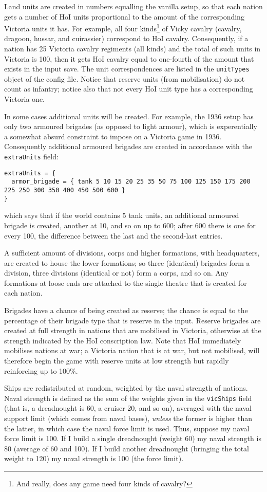 \documentclass[12pt,ebook,oneside]{book}
\begin{document}
Land units are created in numbers equalling the vanilla setup, so that
each nation gets a number of HoI units proportional to the amount of the
corresponding Victoria units it has. For example, all four
kinds\footnote{And really, does any game need four kinds of cavalry?}
of Vicky cavalry (cavalry, dragoon, hussar, and cuirassier) correspond
to HoI cavalry. Consequently, if a nation has 25 Victoria cavalry
regiments (all kinds) and the total of such units in Victoria is 100,
then it gets HoI cavalry equal to one-fourth of the amount that exists
in the input save. The unit correspondences are listed in the
\texttt{unitTypes} object of the config file. Notice that reserve
units (from mobilisation) do not count as infantry; notice also that
not every HoI unit type has a corresponding Victoria one. 

In some cases additional units will be created. For example, the 1936
setup has only two armoured brigades (as opposed to light armour),
which is experentially a somewhat absurd constraint to impose on a
Victoria game in 1936. Consequently additional armoured brigades are
created in accordance with the \texttt{extraUnits} field:
\begin{verbatim}
extraUnits = {
  armor_brigade = { tank 5 10 15 20 25 35 50 75 100 125 150 175 200 225 250 300 350 400 450 500 600 }
}
\end{verbatim}
which says that if the world contains 5 tank units, an additional
armoured brigade is created, another at 10, and so on up to 600; after
600 there is one for every 100, the difference between the last and
the second-last entries. 

A sufficient amount of divisions, corps and higher formations, with headquarters, are created to
house the lower formations; so three (identical) brigades form a
division, three divisions (identical or not) form a corps, and so
on. Any formations at loose ends are attached to the single theatre
that is created for each nation. 

Brigades have a chance of being created as reserve; the chance is
equal to the percentage of their brigade type that is reserve in the
input. Reserve brigades are created at full strength in nations that
are mobilised in Victoria, otherwise at the strength indicated by
the HoI conscription law. Note that HoI immediately mobilises nations
at war; a Victoria nation that is at war, but not mobilised, will
therefore begin the game with reserve units at low strength but
rapidly reinforcing up to 100\%. 

Ships are redistributed at random, weighted by the naval strength of
nations. Naval strength is defined as the sum of the weights given in
the \texttt{vicShips} field (that is, a dreadnought is 60, a cruiser
20, and so on), averaged with the naval support limit (which comes
from naval bases), \emph{unless} the former is higher than the latter,
in which case the naval force limit is used. Thus, suppose my naval
force limit is 100. If I build a single dreadnought (weight 60) my
naval strength is 80 (average of 60 and 100). If I build another
dreadnought (bringing the total weight to 120) my naval strength is
100 (the force limit). 
\end{document}
